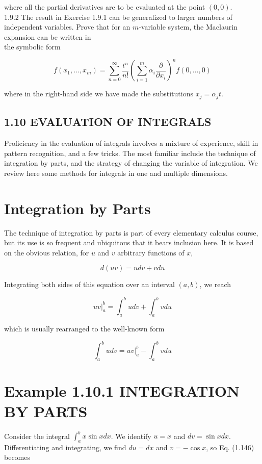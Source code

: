 \documentclass[10pt]{article}
\begin{document}
where all the partial derivatives are to be evaluated at the point $(0,0)$.\\
1.9.2 The result in Exercise 1.9.1 can be generalized to larger numbers of independent variables. Prove that for an $m$-variable system, the Maclaurin expansion can be written in\\
the symbolic form

$$
f\left(x_{1}, \ldots, x_{m}\right)=\sum_{n=0}^{\infty} \frac{t^{n}}{n!}\left(\sum_{i=1}^{m} \alpha_{i} \frac{\partial}{\partial x_{i}}\right)^{n} f(0, \ldots, 0)
$$

where in the right-hand side we have made the substitutions $x_{j}=\alpha_{j} t$.

\subsection*{1.10 EVALUATION OF INTEGRALS}
Proficiency in the evaluation of integrals involves a mixture of experience, skill in pattern recognition, and a few tricks. The most familiar include the technique of integration by parts, and the strategy of changing the variable of integration. We review here some methods for integrals in one and multiple dimensions.

\section*{Integration by Parts}
The technique of integration by parts is part of every elementary calculus course, but its use is so frequent and ubiquitous that it bears inclusion here. It is based on the obvious relation, for $u$ and $v$ arbitrary functions of $x$,

$$
d(u v)=u d v+v d u
$$

Integrating both sides of this equation over an interval $(a, b)$, we reach

$$
\left.u v\right|_{a} ^{b}=\int_{a}^{b} u d v+\int_{a}^{b} v d u
$$

which is usually rearranged to the well-known form


\begin{equation*}
\int_{a}^{b} u d v=\left.u v\right|_{a} ^{b}-\int_{a}^{b} v d u \tag{1.146}
\end{equation*}


\section*{Example 1.10.1 INTEGRATION BY PARTS}
Consider the integral $\int_{a}^{b} x \sin x d x$. We identify $u=x$ and $d v=\sin x d x$. Differentiating and integrating, we find $d u=d x$ and $v=-\cos x$, so Eq. (1.146) becomes
\end{document}
